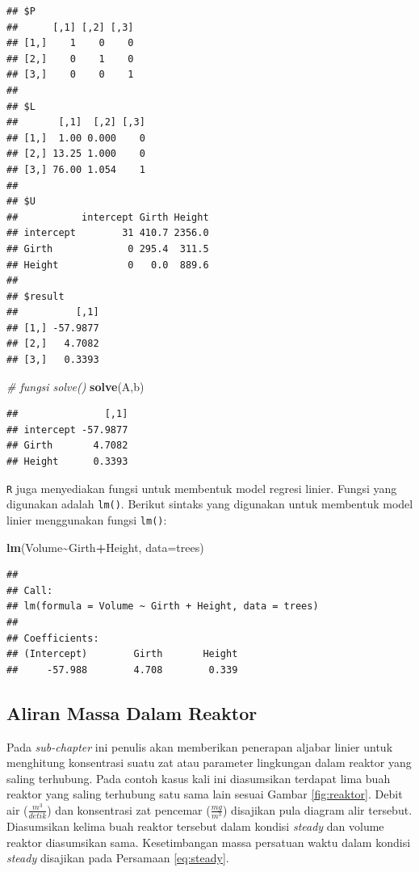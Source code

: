 \documentclass[
]{book}
\newenvironment{Shaded}{\begin{snugshade}}{\end{snugshade}}
\newcommand{\AttributeTok}[1]{\textcolor[rgb]{0.13,0.29,0.53}{#1}}
\newcommand{\CommentTok}[1]{\textcolor[rgb]{0.56,0.35,0.01}{\textit{#1}}}
\newcommand{\FunctionTok}[1]{\textcolor[rgb]{0.13,0.29,0.53}{\textbf{#1}}}
\newcommand{\NormalTok}[1]{#1}
\newcommand{\SpecialCharTok}[1]{\textcolor[rgb]{0.81,0.36,0.00}{\textbf{#1}}}
\theoremstyle{definition}
\theoremstyle{definition}
\theoremstyle{definition}
\theoremstyle{definition}
\theoremstyle{remark}
\begin{document}
\begin{verbatim}
## $P
##      [,1] [,2] [,3]
## [1,]    1    0    0
## [2,]    0    1    0
## [3,]    0    0    1
## 
## $L
##       [,1]  [,2] [,3]
## [1,]  1.00 0.000    0
## [2,] 13.25 1.000    0
## [3,] 76.00 1.054    1
## 
## $U
##           intercept Girth Height
## intercept        31 410.7 2356.0
## Girth             0 295.4  311.5
## Height            0   0.0  889.6
## 
## $result
##          [,1]
## [1,] -57.9877
## [2,]   4.7082
## [3,]   0.3393
\end{verbatim}

\begin{Shaded}
\begin{Highlighting}[]
\CommentTok{\# fungsi solve()}
\FunctionTok{solve}\NormalTok{(A,b)}
\end{Highlighting}
\end{Shaded}

\begin{verbatim}
##               [,1]
## intercept -57.9877
## Girth       4.7082
## Height      0.3393
\end{verbatim}

\texttt{R} juga menyediakan fungsi untuk membentuk model regresi linier. Fungsi yang digunakan adalah \texttt{lm()}. Berikut sintaks yang digunakan untuk membentuk model linier menggunakan fungsi \texttt{lm()}:

\begin{Shaded}
\begin{Highlighting}[]
\FunctionTok{lm}\NormalTok{(Volume}\SpecialCharTok{\textasciitilde{}}\NormalTok{Girth}\SpecialCharTok{+}\NormalTok{Height, }\AttributeTok{data=}\NormalTok{trees)}
\end{Highlighting}
\end{Shaded}

\begin{verbatim}
## 
## Call:
## lm(formula = Volume ~ Girth + Height, data = trees)
## 
## Coefficients:
## (Intercept)        Girth       Height  
##     -57.988        4.708        0.339
\end{verbatim}

\hypertarget{reaktorkimia}{%
\subsection{Aliran Massa Dalam Reaktor}\label{reaktorkimia}}

Pada \emph{sub-chapter} ini penulis akan memberikan penerapan aljabar linier untuk menghitung konsentrasi suatu zat atau parameter lingkungan dalam reaktor yang saling terhubung. Pada contoh kasus kali ini diasumsikan terdapat lima buah reaktor yang saling terhubung satu sama lain sesuai Gambar \ref{fig:reaktor}. Debit air (\(\frac{m^{3}}{detik}\)) dan konsentrasi zat pencemar (\(\frac{mg}{m^3}\)) disajikan pula diagram alir tersebut. Diasumsikan kelima buah reaktor tersebut dalam kondisi \emph{steady} dan volume reaktor diasumsikan sama. Kesetimbangan massa persatuan waktu dalam kondisi \emph{steady} disajikan pada Persamaan \eqref{eq:steady}.
\end{document}
